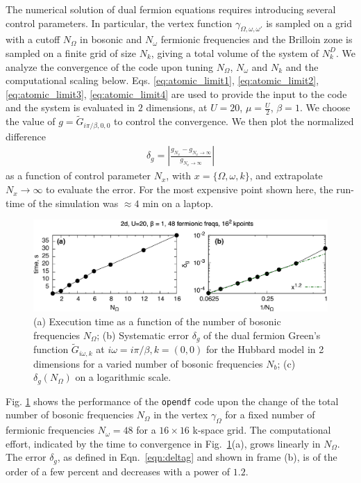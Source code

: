 \documentclass[3p,times,procedia]{elsarticle}
\begin{document}
The numerical solution of dual fermion equations requires introducing several control parameters. In particular,
the vertex function $\gamma_{\Omega,\omega,\omega'}$ is sampled on a grid with a cutoff $N_\Omega$ in bosonic and $N_{\omega}$ fermionic frequencies and the Brilloin zone is sampled on a finite grid of size $N_k$, giving a total volume of the system of $N_k^D$. We analyze the convergence of the code upon tuning $N_{\Omega}$, $N_{\omega}$ and $N_k$ and the computational scaling below. Eqs. \ref{eq:atomic_limit1}, \ref{eq:atomic_limit2}, \ref{eq:atomic_limit3}, \ref{eq:atomic_limit4} are used to provide the input to the code and the system is evaluated in $2$ dimensions, at $U=20$, $\mu = \frac{U}{2}$, $\beta = 1$. We choose the value of $g= \tilde G_{i\pi / \beta, 0, 0}$ to control the convergence. We then plot the normalized difference 
\begin{align}\label{eqn:deltag}
\delta_{g} = \left|\frac{g_{N_x} - g_{N_x \to \infty}}{g_{N_x \to \infty}}\right|
\end{align}
 as a function of control parameter $N_x$, with $x = \{ \Omega, \omega, k \}$, and extrapolate  $N_x \to \infty$ 
to evaluate the error. For the most expensive point shown here, the run-time of the simulation was $\approx 4$ min on a laptop.

\begin{figure}[ht]
\includegraphics[width=1.0\columnwidth]{time_bfreqs.pdf}
\caption{(a) Execution time as a function of the number of bosonic frequencies $N_{\Omega}$; (b) Systematic error $\delta_g$ of the dual fermion Green's function $\tilde G_{i\omega, k}$ at $i\omega = i\pi / \beta, k = (0,0)$ for the Hubbard model in 2 dimensions for a varied number of bosonic frequencies $N_b$; (c) $\delta_g(N_{\Omega})$ on a logarithmic scale. }
\label{fig:benchmark_b}
\end{figure}

Fig. \ref{fig:benchmark_b} shows the performance of the \texttt{opendf} code upon the change of the total number of bosonic frequencies $N_{\Omega}$ in the vertex $\gamma_{\Omega}$ for a fixed number of fermionic frequencies $N_{\omega}=48$ for a $16 \times 16$ k-space grid. The computational effort, indicated by the time to convergence in Fig.~\ref{fig:benchmark_b}(a), grows linearly in $N_{\Omega}$. The error $\delta_g$, as defined in Eqn.~\ref{eqn:deltag} and shown in frame (b), is of the order of a few percent and decreases with a power of $1.2$.
\end{document}
